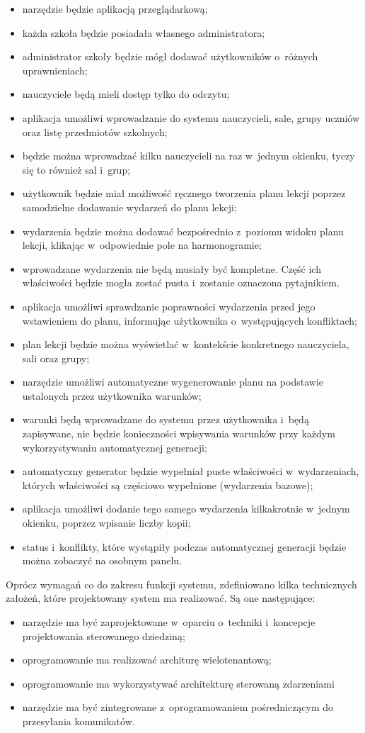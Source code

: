 \documentclass[a4paper]{book}
\begin{document}
\begin{itemize}
	\item narzędzie będzie aplikacją przeglądarkową;
	\item każda szkoła będzie posiadała własnego administratora;
	\item administrator szkoły będzie mógł dodawać użytkowników o~różnych uprawnieniach;
	\item nauczyciele będą mieli dostęp tylko do odczytu;
	\item aplikacja umożliwi wprowadzanie do systemu nauczycieli, sale, grupy uczniów oraz listę przedmiotów szkolnych;
	\item będzie można wprowadzać kilku nauczycieli na raz w~jednym okienku, tyczy się to również sal i~grup;
	\item użytkownik będzie miał możliwość ręcznego tworzenia planu lekcji poprzez samodzielne dodawanie wydarzeń do planu lekcji;
	\item wydarzenia będzie można dodawać bezpośrednio z~poziomu widoku planu lekcji, klikając w~odpowiednie pole na harmonogramie;
	\item wprowadzane wydarzenia nie będą musiały być kompletne. Część ich właściwości będzie mogła zostać pusta i~zostanie oznaczona pytajnikiem.
	\item aplikacja umożliwi sprawdzanie poprawności wydarzenia przed jego wstawieniem do planu, informując użytkownika o~występujących konfliktach;
	\item plan lekcji będzie można wyświetlać w~kontekście konkretnego nauczyciela, sali oraz grupy;
	\item narzędzie umożliwi automatyczne wygenerowanie planu na podstawie ustalonych przez użytkownika warunków;
	\item warunki będą wprowadzane do systemu przez użytkownika i~będą zapisywane, nie będzie konieczności wpisywania warunków przy każdym wykorzystywaniu automatycznej generacji;
	\item automatyczny generator będzie wypełniał puste właściwości w~wydarzeniach, których właściwości są częściowo wypełnione (wydarzenia bazowe);
	\item aplikacja umożliwi dodanie tego samego wydarzenia kilkakrotnie w~jednym okienku, poprzez wpisanie liczby kopii;
	\item status i~konflikty, które wystąpiły podczas automatycznej generacji będzie można zobaczyć na osobnym panelu.
\end{itemize}
Oprócz wymagań co do zakresu funkcji systemu, zdefiniowano kilka technicznych założeń, które projektowany system ma realizować. Są one następujące:
\begin{itemize}
	\item narzędzie ma być zaprojektowane w~oparciu o~techniki i~koncepcje projektowania sterowanego dziedziną;
	\item oprogramowanie ma realizować architurę wielotenantową;
	\item oprogramowanie ma wykorzystywać architekturę sterowaną zdarzeniami
	\item narzędzie ma być zintegrowane z~oprogramowaniem pośredniczącym do przesyłania komunikatów.
\end{itemize}
\end{document}
